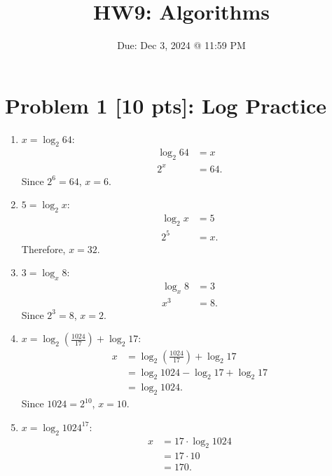 \documentclass[10pt]{article}
\title{HW9: Algorithms}
\author{}
\date{Due: Dec 3, 2024 @ 11:59 PM}
\begin{document}
\maketitle

\newpage

\section*{Problem 1 [10 pts]: Log Practice}

\begin{enumerate}
  \item \( x = \log_2 64 \):
    \begin{align*}
      \log_2{64} &= x \\
      2^x &= 64.
    \end{align*}
    Since \( 2^6 = 64 \), \( x = 6 \).

  \item \( 5 = \log_2 x \):
    \begin{align*}
      \log_2{x} &= 5 \\
      2^5 &= x.
    \end{align*}
    Therefore, \( x = 32 \).

  \item \( 3 = \log_x 8 \):
    \begin{align*}
      \log_x 8 &= 3 \\
      x^3 &= 8.
    \end{align*}
    Since \( 2^3 = 8 \), \( x = 2 \).

  \item \( x = \log_2 \left(\frac{1024}{17}\right) + \log_2 17 \):
    \begin{align*}
      x &= \log_2 \left(\frac{1024}{17}\right) + \log_2 17 \\
      &= \log_2 1024 - \log_2 17 + \log_2 17 \\
      &= \log_2 1024.
    \end{align*}
    Since \( 1024 = 2^{10} \), \( x = 10 \).

  \item \( x = \log_2 1024^{17} \):
    \begin{align*}
      x &= 17 \cdot \log_2 1024 \\
      &= 17 \cdot 10 \\
      &= 170.
    \end{align*}
\end{enumerate}

\newpage
\end{document}
